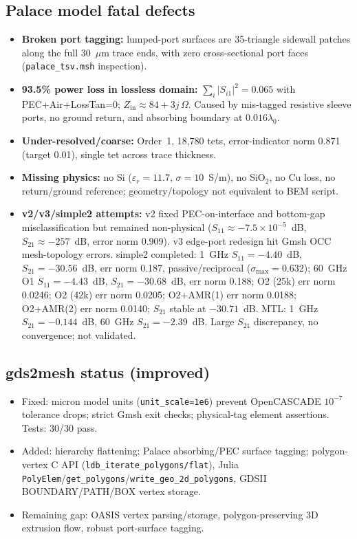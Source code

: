 \documentclass[11pt]{article}
\begin{document}
\subsection*{Palace model fatal defects}
\begin{itemize}
  \item \textbf{Broken port tagging:} lumped-port surfaces are 35-triangle sidewall patches along the full 30~$\mu$m trace ends, with zero cross-sectional port faces (\texttt{palace\_tsv.msh} inspection).
  \item \textbf{93.5\% power loss in lossless domain:} $\sum_i |S_{i1}|^2=0.065$ with PEC+Air+LossTan=0; $Z_{\mathrm{in}}\approx 84+3j\,\Omega$. Caused by mis-tagged resistive sleeve ports, no ground return, and absorbing boundary at $0.016\lambda_0$.
  \item \textbf{Under-resolved/coarse:} Order~1, 18,780 tets, error-indicator norm 0.871 (target 0.01), single tet across trace thickness.
  \item \textbf{Missing physics:} no Si ($\varepsilon_r=11.7$, $\sigma=10$~S/m), no SiO$_2$, no Cu loss, no return/ground reference; geometry/topology not equivalent to BEM script.
  \item \textbf{v2/v3/simple2 attempts:} v2 fixed PEC-on-interface and bottom-gap misclassification but remained non-physical ($S_{11}\approx -7.5\times10^{-5}$~dB, $S_{21}\approx -257$~dB, error norm 0.909). v3 edge-port redesign hit Gmsh OCC mesh-topology errors. simple2 completed: 1~GHz $S_{11}=-4.40$~dB, $S_{21}=-30.56$~dB, err norm 0.187, passive/reciprocal ($\sigma_{\max}=0.632$); 60~GHz O1 $S_{11}=-4.43$~dB, $S_{21}=-30.68$~dB, err norm 0.188; O2 (25k) err norm 0.0246; O2 (42k) err norm 0.0205; O2+AMR(1) err norm 0.0188; O2+AMR(2) err norm 0.0140; $S_{21}$ stable at $-30.71$~dB. MTL: 1~GHz $S_{21}=-0.144$~dB, 60~GHz $S_{21}=-2.39$~dB. Large $S_{21}$ discrepancy, no convergence; not validated.
\end{itemize}

\subsection*{gds2mesh status (improved)}
\begin{itemize}
  \item Fixed: micron model units (\texttt{unit\_scale=1e6}) prevent OpenCASCADE $10^{-7}$ tolerance drops; strict Gmsh exit checks; physical-tag element assertions. Tests: 30/30 pass.
  \item Added: hierarchy flattening; Palace absorbing/PEC surface tagging; polygon-vertex C API (\texttt{ldb\_iterate\_polygons/flat}), Julia \texttt{PolyElem}/\texttt{get\_polygons}/\texttt{write\_geo\_2d\_polygons}, GDSII BOUNDARY/PATH/BOX vertex storage.
  \item Remaining gap: OASIS vertex parsing/storage, polygon-preserving 3D extrusion flow, robust port-surface tagging.
\end{itemize}
\end{document}
